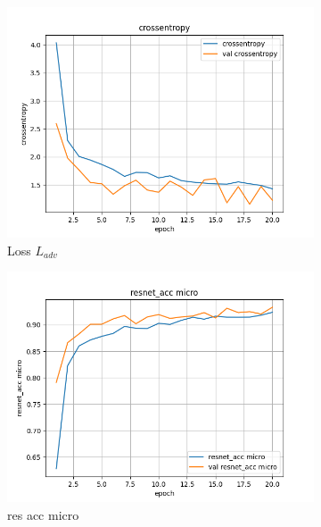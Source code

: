 \documentclass[a4paper]{article}
\begin{document}
\begin{figure}[ht]
    \centering
    \begin{subfigure}{0.32\textwidth}
        \centering
        \includegraphics[width=\linewidth]{../logs/adv_img256_1/crossentropy.png}
        \caption{Loss $L_{adv}$}
    \end{subfigure}
    \begin{subfigure}{0.32\textwidth}
        \centering
        \includegraphics[width=\linewidth]{../logs/adv_img256_1/resnet_acc micro.png}
        \caption{res acc micro}
    \end{subfigure}
    \begin{subfigure}{0.32\textwidth}
        \centering

\end{subfigure}
\end{figure}
\end{document}
